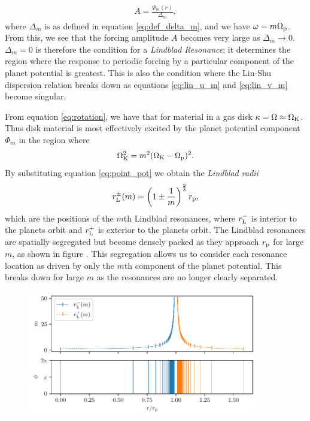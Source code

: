 \begin{align}
    A = \frac{\Psi_m (r)}{\Delta_m},
\end{align}
where $\Delta_m$ is as defined in equation \ref{eq:def_delta_m}, and we have $\omega = m \Omega_{\rm p} $.
From this, we see that the forcing amplitude $A$ becomes very large as $\Delta_m \rightarrow 0$.
$\Delta_m = 0$ is therefore the condition for a \textit{Lindblad Resonance}; it determines the region where the response to periodic forcing by a particular component of the planet potential is greatest.
This is also the condition where the Lin-Shu dispersion relation breaks down as equations \ref{eq:lin_u_m} and \ref{eq:lin_v_m} become singular.

From equation \ref{eq:rotation}, we have that for material in a gas disk $\kappa = \Omega \approx \Omega_{\rm K}$.
Thus disk material is most effectively excited by the planet potential component $\Phi_m$ in the region where
\begin{align}
    \Omega_{\rm K}^2 = m^2 (\Omega_{\rm K} - \Omega_{\rm p})^2.
\end{align}
By substituting equation \ref{eq:point_pot} we obtain the \textit{Lindblad radii}
\begin{align}
    r_{\rm L}^\pm(m) = \left( 1 \pm \frac{1}{m} \right)^\frac{2}{3} r_{\rm p}, \label{eq:lind_loc}
\end{align}
which are the positions of the $m$th Lindblad resonances, where $r_{\rm L}^-$ is interior to the planets orbit and $r_{\rm L}^+$ is exterior to the planets orbit.
The Lindblad resonances are spatially segregated but become densely packed as they approach $r_{\rm p}$ for large $m$, as shown in figure .
This segregation allows us to consider each resonance location as driven by only the $m$th component of the planet potential.
This breaks down for large $m$ as the resonances are no longer clearly separated.

\begin{figure}
    \centering
    \includegraphics[width = 0.9\textwidth]{figures/lindblad_two_panel.pdf}
    \caption{}
    \label{fig:lindblad}
\end{figure}

